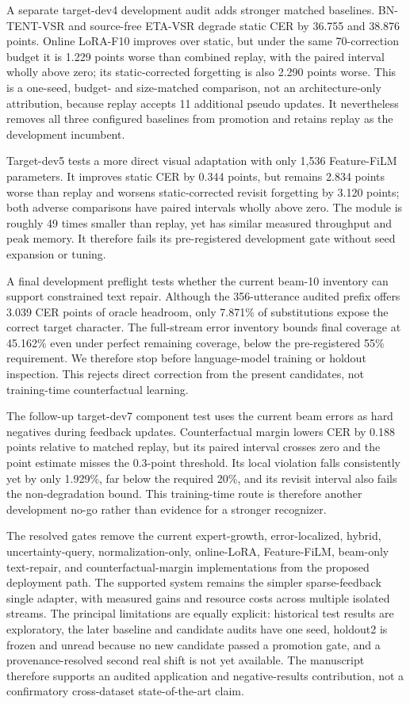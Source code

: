 A separate target-dev4 development audit adds stronger matched baselines. BN-TENT-VSR and source-free ETA-VSR degrade static CER by 36.755 and 38.876 points. Online LoRA-F10 improves over static, but under the same 70-correction budget it is 1.229 points worse than combined replay, with the paired interval wholly above zero; its static-corrected forgetting is also 2.290 points worse. This is a one-seed, budget- and size-matched comparison, not an architecture-only attribution, because replay accepts 11 additional pseudo updates. It nevertheless removes all three configured baselines from promotion and retains replay as the development incumbent.

Target-dev5 tests a more direct visual adaptation with only 1,536 Feature-FiLM parameters. It improves static CER by 0.344 points, but remains 2.834 points worse than replay and worsens static-corrected revisit forgetting by 3.120 points; both adverse comparisons have paired intervals wholly above zero. The module is roughly 49 times smaller than replay, yet has similar measured throughput and peak memory. It therefore fails its pre-registered development gate without seed expansion or tuning.

A final development preflight tests whether the current beam-10 inventory can support constrained text repair. Although the 356-utterance audited prefix offers 3.039 CER points of oracle headroom, only 7.871\% of substitutions expose the correct target character. The full-stream error inventory bounds final coverage at 45.162\% even under perfect remaining coverage, below the pre-registered 55\% requirement. We therefore stop before language-model training or holdout inspection. This rejects direct correction from the present candidates, not training-time counterfactual learning.

The follow-up target-dev7 component test uses the current beam errors as hard negatives during feedback updates. Counterfactual margin lowers CER by 0.188 points relative to matched replay, but its paired interval crosses zero and the point estimate misses the 0.3-point threshold. Its local violation falls consistently yet by only 1.929\%, far below the required 20\%, and its revisit interval also fails the non-degradation bound. This training-time route is therefore another development no-go rather than evidence for a stronger recognizer.

The resolved gates remove the current expert-growth, error-localized, hybrid, uncertainty-query, normalization-only, online-LoRA, Feature-FiLM, beam-only text-repair, and counterfactual-margin implementations from the proposed deployment path. The supported system remains the simpler sparse-feedback single adapter, with measured gains and resource costs across multiple isolated streams. The principal limitations are equally explicit: historical test results are exploratory, the later baseline and candidate audits have one seed, holdout2 is frozen and unread because no new candidate passed a promotion gate, and a provenance-resolved second real shift is not yet available. The manuscript therefore supports an audited application and negative-results contribution, not a confirmatory cross-dataset state-of-the-art claim.
